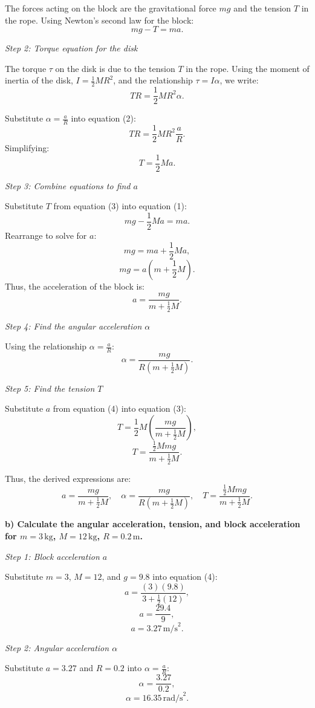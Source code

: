 The forces acting on the block are the gravitational force $mg$ and the tension $T$ in the rope. Using Newton's second law for the block:
\[
mg - T = ma. \tag{1}
\]

\textit{Step 2: Torque equation for the disk}

The torque $\tau$ on the disk is due to the tension $T$ in the rope. Using the moment of inertia of the disk, $I = \frac{1}{2}MR^2$, and the relationship $\tau = I\alpha$, we write:
\[
TR = \frac{1}{2}MR^2\alpha. \tag{2}
\]

Substitute $\alpha = \frac{a}{R}$ into equation (2):
\[
TR = \frac{1}{2}MR^2\frac{a}{R}.
\]
Simplifying:
\[
T = \frac{1}{2}Ma. \tag{3}
\]

\textit{Step 3: Combine equations to find $a$}

Substitute $T$ from equation (3) into equation (1):
\[
mg - \frac{1}{2}Ma = ma.
\]
Rearrange to solve for $a$:
\[
mg = ma + \frac{1}{2}Ma,
\]
\[
mg = a\left(m + \frac{1}{2}M\right).
\]
Thus, the acceleration of the block is:
\[
a = \frac{mg}{m + \frac{1}{2}M}. \tag{4}
\]

\textit{Step 4: Find the angular acceleration $\alpha$}

Using the relationship $\alpha = \frac{a}{R}$:
\[
\alpha = \frac{mg}{R\left(m + \frac{1}{2}M\right)}. \tag{5}
\]

\textit{Step 5: Find the tension $T$}

Substitute $a$ from equation (4) into equation (3):
\[
T = \frac{1}{2}M\left(\frac{mg}{m + \frac{1}{2}M}\right),
\]
\[
T = \frac{\frac{1}{2}Mmg}{m + \frac{1}{2}M}. \tag{6}
\]

Thus, the derived expressions are:
\[
a = \frac{mg}{m + \frac{1}{2}M}, \quad \alpha = \frac{mg}{R\left(m + \frac{1}{2}M\right)}, \quad T = \frac{\frac{1}{2}Mmg}{m + \frac{1}{2}M}.
\]

\textbf{b) Calculate the angular acceleration, tension, and block acceleration for $m = 3\,\text{kg}$, $M = 12\,\text{kg}$, $R = 0.2\,\text{m}$.}

\textit{Step 1: Block acceleration $a$}

Substitute $m = 3$, $M = 12$, and $g = 9.8$ into equation (4):
\[
a = \frac{(3)(9.8)}{3 + \frac{1}{2}(12)},
\]
\[
a = \frac{29.4}{9},
\]
\[
a = 3.27\,\text{m/s}^2.
\]

\textit{Step 2: Angular acceleration $\alpha$}

Substitute $a = 3.27$ and $R = 0.2$ into $\alpha = \frac{a}{R}$:
\[
\alpha = \frac{3.27}{0.2},
\]
\[
\alpha = 16.35\,\text{rad/s}^2.
\]

